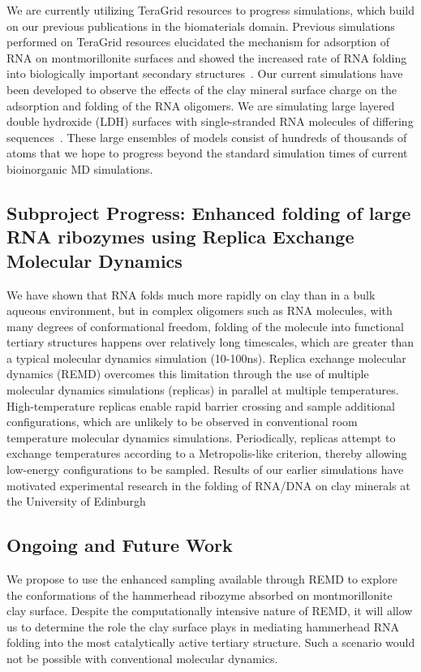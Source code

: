 \documentclass[a4paper,10pt]{article}
\begin{document}
We are currently utilizing TeraGrid resources to progress simulations, which build on our previous publications in the biomaterials domain. Previous simulations performed on TeraGrid resources elucidated the mechanism for adsorption of RNA on montmorillonite surfaces and showed the increased rate of RNA folding into biologically important secondary structures~\cite{Ref9}. Our current simulations have been developed to observe the effects of the clay mineral surface charge on the adsorption and folding of the RNA oligomers. We are simulating large layered double hydroxide (LDH) surfaces with single-stranded RNA molecules of differing sequences~\cite{Ref10}. These large ensembles of models consist of hundreds of thousands of atoms that we hope to progress beyond the standard simulation times of current bioinorganic MD simulations.

\subsection{Subproject Progress: Enhanced folding of large RNA ribozymes using Replica Exchange Molecular Dynamics}

We have shown that RNA folds much more rapidly on clay than in a bulk aqueous environment,
but in complex oligomers such as RNA molecules, with many degrees of conformational freedom, folding of the molecule into functional tertiary structures happens over relatively long timescales, which are greater than a typical molecular dynamics simulation (10-100ns). Replica exchange molecular dynamics (REMD) overcomes this limitation through the use of multiple molecular dynamics simulations (replicas) in parallel at multiple temperatures. High-temperature replicas enable rapid barrier crossing and sample additional configurations, which are unlikely to be observed in conventional room temperature molecular dynamics simulations. Periodically, replicas attempt to exchange temperatures according to a Metropolis-like criterion, thereby allowing low-energy configurations to be sampled. Results of our earlier simulations have motivated experimental research in the folding of RNA/DNA on clay minerals at the University of Edinburgh

\subsection{Ongoing and Future Work}
We propose to use the enhanced sampling available through REMD to explore the conformations of the hammerhead ribozyme absorbed on montmorillonite clay surface. Despite the computationally intensive nature of REMD, it will allow us to determine the role the clay surface plays in mediating hammerhead RNA folding into the most catalytically active tertiary structure. Such a scenario would not be possible with conventional molecular dynamics.
\end{document}
